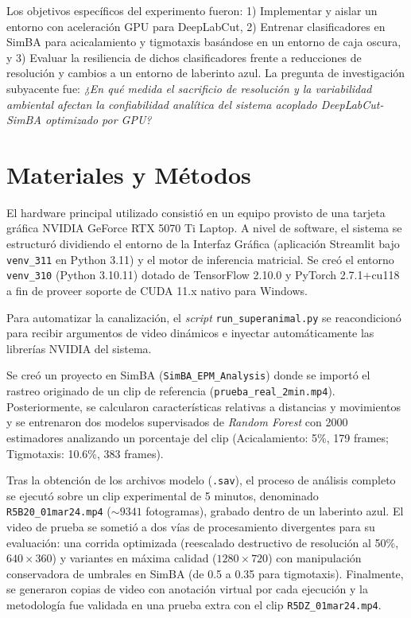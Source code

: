 \documentclass[12pt,a4paper]{article}
\begin{document}
Los objetivos específicos del experimento fueron: 1) Implementar y aislar un entorno con aceleración GPU para DeepLabCut, 2) Entrenar clasificadores en SimBA para acicalamiento y tigmotaxis basándose en un entorno de caja oscura, y 3) Evaluar la resiliencia de dichos clasificadores frente a reducciones de resolución y cambios a un entorno de laberinto azul. La pregunta de investigación subyacente fue: \textit{¿En qué medida el sacrificio de resolución y la variabilidad ambiental afectan la confiabilidad analítica del sistema acoplado DeepLabCut-SimBA optimizado por GPU?}

\section{Materiales y Métodos}
El hardware principal utilizado consistió en un equipo provisto de una tarjeta gráfica NVIDIA GeForce RTX 5070 Ti Laptop. A nivel de software, el sistema se estructuró dividiendo el entorno de la Interfaz Gráfica (aplicación Streamlit bajo \texttt{venv\_311} en Python 3.11) y el motor de inferencia matricial. Se creó el entorno \texttt{venv\_310} (Python 3.10.11) dotado de TensorFlow 2.10.0 y PyTorch 2.7.1+cu118 a fin de proveer soporte de CUDA 11.x nativo para Windows.

Para automatizar la canalización, el \textit{script} \texttt{run\_superanimal.py} se reacondicionó para recibir argumentos de video dinámicos e inyectar automáticamente las librerías NVIDIA del sistema.

Se creó un proyecto en SimBA (\texttt{SimBA\_EPM\_Analysis}) donde se importó el rastreo originado de un clip de referencia (\texttt{prueba\_real\_2min.mp4}). Posteriormente, se calcularon características relativas a distancias y movimientos y se entrenaron dos modelos supervisados de \textit{Random Forest} con 2000 estimadores analizando un porcentaje del clip (Acicalamiento: 5\%, 179 frames; Tigmotaxis: 10.6\%, 383 frames). 

Tras la obtención de los archivos modelo (\texttt{.sav}), el proceso de análisis completo se ejecutó sobre un clip experimental de 5 minutos, denominado \texttt{R5B20\_01mar24.mp4} ($\sim9341$ fotogramas), grabado dentro de un laberinto azul. El video de prueba se sometió a dos vías de procesamiento divergentes para su evaluación: una corrida optimizada (reescalado destructivo de resolución al 50\%, $640\times360$) y variantes en máxima calidad ($1280\times720$) con manipulación conservadora de umbrales en SimBA (de 0.5 a 0.35 para tigmotaxis). Finalmente, se generaron copias de video con anotación virtual por cada ejecución y la metodología fue validada en una prueba extra con el clip \texttt{R5DZ\_01mar24.mp4}.
\end{document}
